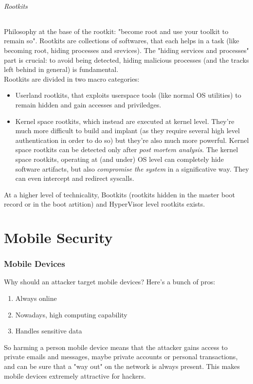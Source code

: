 \documentclass{article}
\begin{document}
				\paragraph{Rootkits}
					Philosophy at the base of the rootkit: "become root and use your toolkit to remain so". Rootkits are collections of softwares, that each helps in a task (like becoming root, hiding processes and srevices). The "hiding services and processes" part is crucial: to avoid being detected, hiding malicious processes (and the tracks left behind in general) is fundamental.\\
					Rootkits are divided in two macro categories:
					\begin{itemize}
						\item Userland rootkits, that exploits userspace tools (like normal OS utilities) to remain hidden and gain accesses and priviledges.
						\item Kernel space rootkits, which instead are executed at kernel level. They're much more difficult to build and implant (as they require several high level authentication in order to do so) but they're also much more powerful. Kernel space rootkits can be detected only after \emph{post mortem analysis}. The kernel space rootkits, operating at (and under) OS level can completely hide software artifacts, but also \emph{compromise the system} in a significative way. They can even intercept and redirect syscalls.
					\end{itemize}
					At a higher level of technicality, Bootkits (rootkits hidden in the master boot record or in the boot artition) and HyperVisor level rootkits exists. 
	
	\clearpage \part{Mobile Security}
		\section{Mobile Devices}
			Why should an attacker target mobile devices? Here's a bunch of pros:
			\begin{enumerate}
				\item Always online
				\item Nowadays, high computing capability
				\item Handles sensitive data
			\end{enumerate}
			So harming a person mobile device means that the attacker gains access to private emails and messages, maybe private accounts or personal transactions, and can be sure that a "way out" on the network is always present. This makes mobile devices extremely attractive for hackers.
			
\end{document}
